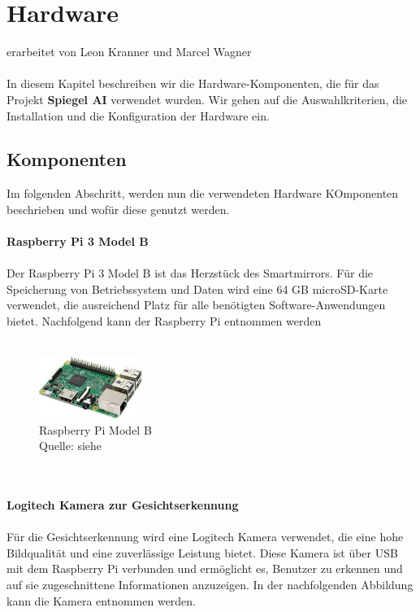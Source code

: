 \chapter{Hardware}
erarbeitet von Leon Kranner und Marcel Wagner \\ \\
\noindent
In diesem Kapitel beschreiben wir die Hardware-Komponenten, die für das Projekt \textbf{Spiegel AI} verwendet wurden. Wir gehen auf die Auswahlkriterien, die Installation und die Konfiguration der Hardware ein.

\section{Komponenten}
Im folgenden Abschritt, werden nun die verwendeten Hardware KOmponenten beschrieben und wofür diese genutzt werden. \\ \\
\noindent
\textbf{Raspberry Pi 3 Model B} \\ \\
Der Raspberry Pi 3 Model B ist das Herzstück des Smartmirrors. Für die Speicherung von Betriebssystem und Daten wird eine 64 GB microSD-Karte verwendet, die ausreichend Platz für alle benötigten Software-Anwendungen bietet. Nachfolgend kann der Raspberry Pi entnommen werden\\ \\
\noindent
\begin{figure}[h]
    \centering
    \includegraphics[width=0.3\textwidth]{pictures/raspberry_pi.jpg}
  \captionsetup{justification=centering, labelformat=simple, singlelinecheck=false}
    \caption[Raspberry Pi Model B]{Raspberry Pi Model B\\ Quelle: siehe \cite{raspberry_pi}}
\end{figure} \\ \\
\noindent
\textbf{Logitech Kamera zur Gesichtserkennung} \\ \\
Für die Gesichtserkennung wird eine Logitech Kamera verwendet, die eine hohe Bildqualität und eine zuverlässige Leistung bietet. Diese Kamera ist über USB mit dem Raspberry Pi verbunden und ermöglicht es, Benutzer zu erkennen und auf sie zugeschnittene Informationen anzuzeigen. In der nachfolgenden Abbildung kann die Kamera entnommen werden.\\ \\
